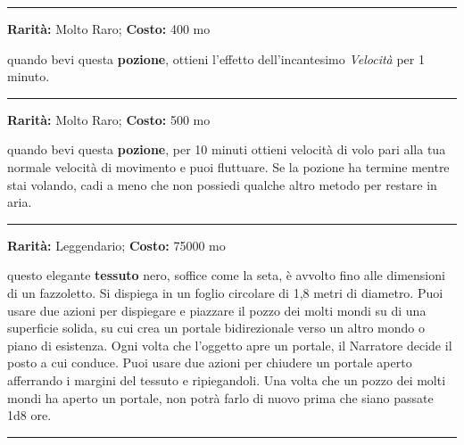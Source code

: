 \begin{multicols}{2}
\smallskip\noindent\rule{\linewidth}{2pt}  \hypertarget{PozionediVelocità}{}\smallskip{}\noindent\label{PozionediVelocità}

\textbf{Rarità:} Molto Raro; \textbf{Costo:} 400 mo

quando bevi questa \textbf{pozione}, ottieni l'effetto dell'incantesimo \emph{Velocità} per 1 minuto.

\smallskip\noindent\rule{\linewidth}{2pt}  \hypertarget{PozionediVolo}{}\smallskip{}\noindent\label{PozionediVolo}

\textbf{Rarità:} Molto Raro; \textbf{Costo:} 500 mo

quando bevi questa \textbf{pozione}, per 10 minuti ottieni velocità di volo pari alla tua normale velocità di movimento e puoi fluttuare. Se la pozione ha termine mentre stai volando, cadi a meno che non possiedi qualche altro metodo per restare in aria.

\smallskip\noindent\rule{\linewidth}{2pt}  \hypertarget{PozzodeiMoltiMondi}{}\smallskip{}\noindent\label{PozzodeiMoltiMondi}

\textbf{Rarità:} Leggendario; \textbf{Costo:} 75000 mo

questo elegante \textbf{tessuto} nero, soffice come la seta, è avvolto fino alle dimensioni di un fazzoletto. Si dispiega in un foglio circolare di 1,8 metri di diametro. Puoi usare due azioni per dispiegare e piazzare il pozzo dei molti mondi su di una superficie solida, su cui crea un portale bidirezionale verso un altro mondo o piano di esistenza. Ogni volta che l'oggetto apre un portale, il Narratore decide il posto a cui conduce. Puoi usare due azioni per chiudere un portale aperto afferrando i margini del tessuto e ripiegandoli. Una volta che un pozzo dei molti mondi ha aperto un portale, non potrà farlo di nuovo prima che siano passate 1d8 ore.

\smallskip\noindent\rule{\linewidth}{2pt}  \hypertarget{ResistenzaalVeleno}{}\smallskip{}\noindent\label{ResistenzaalVeleno}


\end{multicols}
